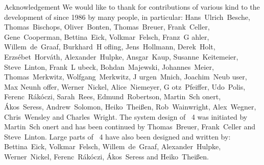 {\obeylines
{\secfont Acknowledgement}
\bigskip
We would like to thank for contributions of various kind to the development
of {\GAP} since 1986 by many people, in particular:
\medskip
Hans~Ulrich~Besche, Thomas~Bischops, Oliver~Bonten, Thomas~Breuer,
Frank~Celler, Gene~Cooperman, Bettina~Eick, Volkmar~Felsch, Franz~G{ a}hler,
Willem~de~Graaf, Burkhard~H{ o}fling, Jens~Hollmann, Derek~Holt,
Erzs{\'e}bet~Horv{\'a}th, Alexander~Hulpke, Ansgar~Kaup, Susanne~Keitemeier,
Steve~Linton, Frank~L{ u}beck, Bohdan~Majewski, Johannes~Meier,
Thomas~Merkwitz, Wolfgang~Merkwitz, J{ u}rgen~Mnich, Joachim~Neub{ u}ser,
Max Neunh{ o}ffer, Werner~Nickel, Alice~Niemeyer, G{ o}tz~Pfeiffer,
Udo~Polis, Ferenc~R{\'a}k{\'o}czi, Sarah~Rees, Edmund~Robertson,
Martin~Sch{ o}nert, {\'A}kos~Seress, Andrew~Solomon, Heiko~Thei{\ss}en,
Rob~Wainwright, Alex~Wegner, Chris~Wensley  and Charles~Wright.
\bigskip \bigskip \bigskip
The system design of {\GAP}~4 was initiated by
Martin~Sch{ o}nert and has been continued by
Thomas~Breuer, Frank~Celler and Steve~Linton.
\bigskip
Large parts of {\GAP}~4 have also been designed and written by:
\medskip
Bettina~Eick, Volkmar~Felsch, Willem~de~Graaf, Alexander~Hulpke,
Werner~Nickel, Ferenc~R{\'a}k{\'o}czi, {\'A}kos~Seress and Heiko~Thei{\ss}en.
}
